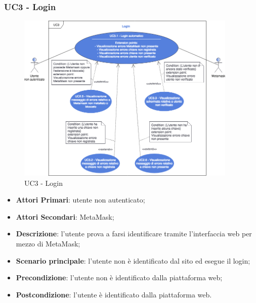\subsubsection{UC3 - Login}
\begin{figure}[h]
	\includegraphics[width=10.5cm]{res/images/UC3Login.png} %
	\centering
	\caption{UC3 - Login}
	
\end{figure}
\begin{itemize}
	\item \textbf{Attori Primari}:
	utente non autenticato;
	\item \textbf{Attori Secondari}:
	MetaMask\glo;
	\item \textbf{Descrizione}:
	l'utente prova a farsi identificare tramite l'interfaccia web per mezzo di MetaMask\glo;
	\item \textbf{Scenario principale}:
	l'utente non è identificato dal sito ed esegue il login;
	\item \textbf{Precondizione}:
	l'utente non è identificato dalla piattaforma web;
	\item \textbf{Postcondizione}:
	l'utente è identificato dalla piattaforma web. 
\end{itemize}
